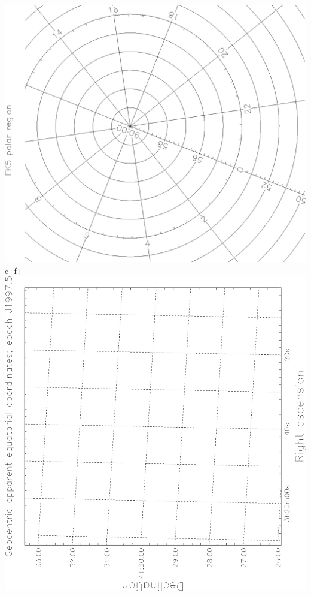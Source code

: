 \documentclass[twoside,11pt]{article}
\newenvironment{latexonly}{}{}
\begin{document}
\begin{latexonly}
\begin{center}
   \includegraphics[scale=0.25,angle=-90]{sun211_figures/frontc_bw.eps}\hfill
c-
f+
   \includegraphics[scale=0.25,angle=-90]{sun210_figures/fronta_bw.eps}\hfill

\end{center}
\end{latexonly}
\end{document}
